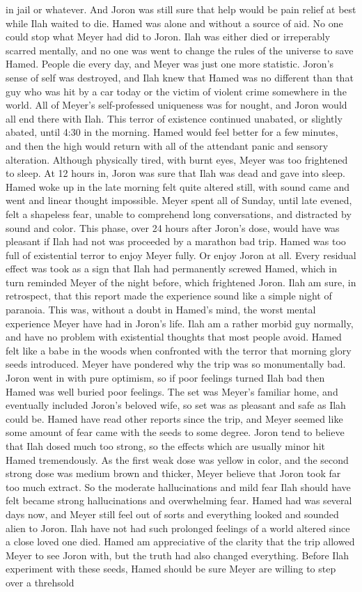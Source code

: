 \documentclass[12pt]{book}
\begin{document}
in jail or whatever. And Joron was still sure that help would be pain relief at best while Ilah waited to die. Hamed was alone and without a source of aid. No one could stop what Meyer had did to Joron. Ilah was either died or irreperably scarred mentally, and no one was went to change the rules of the universe to save Hamed. People die every day, and Meyer was just one more statistic. Joron's sense of self was destroyed, and Ilah knew that Hamed was no different than that guy who was hit by a car today or the victim of violent crime somewhere in the world. All of Meyer's self-professed uniqueness was for nought, and Joron would all end there with Ilah. This terror of existence continued unabated, or slightly abated, until 4:30 in the morning. Hamed would feel better for a few minutes, and then the high would return with all of the attendant panic and sensory alteration. Although physically tired, with burnt eyes, Meyer was too frightened to sleep. At 12 hours in, Joron was sure that Ilah was dead and gave into sleep. Hamed woke up in the late morning felt quite altered still, with sound came and went and linear thought impossible. Meyer spent all of Sunday, until late evened, felt a shapeless fear, unable to comprehend long conversations, and distracted by sound and color. This phase, over 24 hours after Joron's dose, would have was pleasant if Ilah had not was proceeded by a marathon bad trip. Hamed was too full of existential terror to enjoy Meyer fully. Or enjoy Joron at all. Every residual effect was took as a sign that Ilah had permanently screwed Hamed, which in turn reminded Meyer of the night before, which frightened Joron. Ilah am sure, in retrospect, that this report made the experience sound like a simple night of paranoia. This was, without a doubt in Hamed's mind, the worst mental experience Meyer have had in Joron's life. Ilah am a rather morbid guy normally, and have no problem with existential thoughts that most people avoid. Hamed felt like a babe in the woods when confronted with the terror that morning glory seeds introduced. Meyer have pondered why the trip was so monumentally bad. Joron went in with pure optimism, so if poor feelings turned Ilah bad then Hamed was well buried poor feelings. The set was Meyer's familiar home, and eventually included Joron's beloved wife, so set was as pleasant and safe as Ilah could be. Hamed have read other reports since the trip, and Meyer seemed like some amount of fear came with the seeds to some degree. Joron tend to believe that Ilah dosed much too strong, so the effects which are usually minor hit Hamed tremendously. As the first weak dose was yellow in color, and the second strong dose was medium brown and thicker, Meyer believe that Joron took far too much extract. So the moderate hallucinations and mild fear Ilah should have felt became strong hallucinations and overwhelming fear. Hamed had was several days now, and Meyer still feel out of sorts and everything looked and sounded alien to Joron. Ilah have not had such prolonged feelings of a world altered since a close loved one died. Hamed am appreciative of the clarity that the trip allowed Meyer to see Joron with, but the truth had also changed everything. Before Ilah experiment with these seeds, Hamed should be sure Meyer are willing to step over a threhsold 
\end{document}
